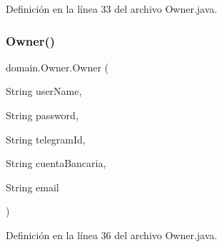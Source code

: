 Definición en la línea 33 del archivo Owner.\+java.


\begin{DoxyCode}{0}

\end{DoxyCode}
\mbox{\label{classdomain_1_1_owner_aacd09c8566d1377947340a67f78017de}} 
\subsubsection{\texorpdfstring{Owner()}{Owner()}\hspace{0.1cm}{\footnotesize\ttfamily [2/2]}}
{\footnotesize\ttfamily domain.\+Owner.\+Owner (\begin{DoxyParamCaption}\item[{String}]{user\+Name,  }\item[{String}]{password,  }\item[{String}]{telegram\+Id,  }\item[{String}]{cuenta\+Bancaria,  }\item[{String}]{email }\end{DoxyParamCaption})}



Definición en la línea 36 del archivo Owner.\+java.



